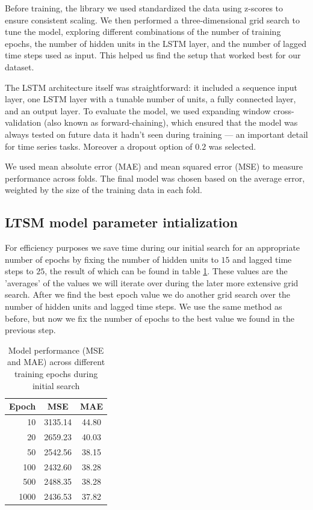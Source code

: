\documentclass[conference]{IEEEtran}
\begin{document}
Before training, the library we used standardized the data using z-scores to ensure consistent scaling. We 
then performed a three-dimensional grid search to tune the model, exploring different combinations of the 
number of training epochs, the number of hidden units in the LSTM layer, and the number of lagged time 
steps used as input. This helped us find the setup that worked best for our dataset.

The LSTM architecture itself was straightforward: it included a sequence input layer, one LSTM layer with 
a tunable number of units, a fully connected layer, and an output layer. To evaluate the model, we used 
expanding window cross-validation (also known as forward-chaining), which ensured that the model was 
always tested on future data it hadn’t seen during training — an important detail for time series tasks.
Moreover a dropout option of $0.2$ was selected.

We used mean absolute error (MAE) and mean squared error (MSE) to measure performance across folds. The 
final model was chosen based on the average error, weighted by the size of the training data in each fold.

\subsection{LTSM model parameter intialization}
For efficiency purposes we save time during our initial search for an appropriate number of epochs by 
fixing the number of hidden units to $15$ and lagged time steps to $25$, the result of which can be found in table \ref{tab:epoch_performance}. 
These values are the 'averages'
of the values we will iterate over during the later more extensive grid search. 
After we find the best epoch value we do another grid search over the number of hidden units and lagged
time steps. We use the same method as before, but now we fix the number of epochs to the best value
we found in the previous step. 

\begin{table}[h!]
    \centering
    \begin{tabular}{rcc}
    \hline
    \textbf{Epoch} & \textbf{MSE} & \textbf{MAE} \\
    \hline
    10   & 3135.14 & 44.80 \\
    20   & 2659.23 & 40.03 \\
    50   & 2542.56 & 38.15 \\
    100  & 2432.60 & 38.28 \\
    500  & 2488.35 & 38.28 \\
    1000 & 2436.53 & 37.82 \\
    \hline
    \end{tabular}
    \caption{Model performance (MSE and MAE) across different training epochs during initial search}
    \label{tab:epoch_performance}
\end{table}  
\end{document}
